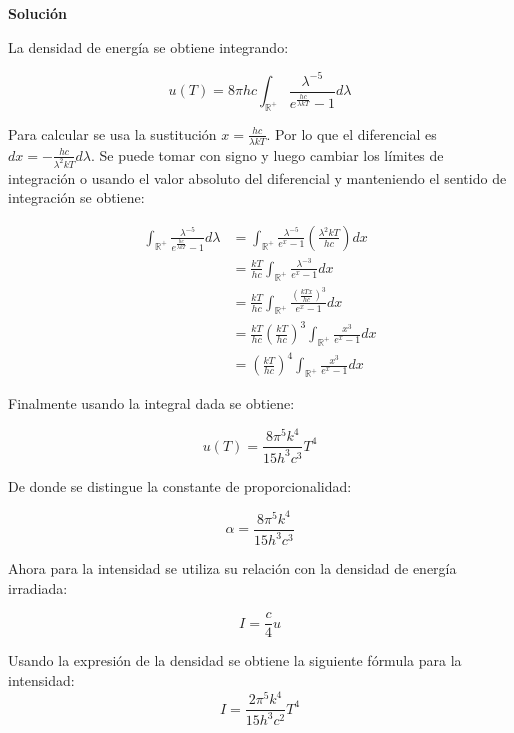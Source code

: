 \documentclass[12pt]{article}
\begin{document}
\begin{center}
	\textbf{Solución}
\end{center}

La densidad de energía se obtiene integrando:

\begin{equation*}
u(T) = 8\pi h c \int_{\mathbb{R}^+} \frac{\lambda^{-5}}{e^{\frac{hc}{\lambda k T}}-1} d\lambda
\end{equation*}

Para calcular se usa la sustitución $x =\frac{hc}{\lambda k T}$. Por lo que el diferencial es $dx = -\frac{hc}{\lambda^2 k T} d\lambda$. Se puede tomar con signo y luego cambiar los límites de integración o usando el valor absoluto del diferencial y manteniendo el sentido de integración se obtiene:

\begin{align*}
\int_{\mathbb{R}^+} \frac{\lambda^{-5}}{e^{\frac{hc}{\lambda k T}}-1} d\lambda &=\int_{\mathbb{R}^+} \frac{\lambda^{-5}}{e^{x}-1}\left(\frac{\lambda^2 k T}{hc}\right) dx \\
&=\frac{k T}{hc}\int_{\mathbb{R}^+}\frac{\lambda^{-3}}{e^{x}-1}dx \\
&=\frac{k T}{hc}\int_{\mathbb{R}^+}\frac{\left(\frac{kTx}{hc}\right)^3}{e^{x}-1}dx \\
&=\frac{k T}{hc}\left(\frac{kT}{hc}\right)^3\int_{\mathbb{R}^+}\frac{x^3}{e^{x}-1}dx \\
&=\left(\frac{kT}{hc}\right)^4\int_{\mathbb{R}^+}\frac{x^3}{e^{x}-1}dx 
\end{align*} 

Finalmente usando la integral dada se obtiene:


\begin{equation*}
u(T) = \frac{8\pi^5 k^ 4}{15 h^ 3 c^3} T^ 4
\end{equation*}

De donde se distingue la constante de proporcionalidad:

\begin{equation*}
\alpha = \frac{8\pi^5 k^ 4}{15 h^ 3 c^3} 
\end{equation*}

Ahora para la intensidad se utiliza su relación con la densidad de energía irradiada:

\begin{equation*}
I = \frac{c}{4}u
\end{equation*}

Usando la expresión de la densidad se obtiene la siguiente fórmula para la intensidad:
\begin{equation*}
I = \frac{2\pi^5 k^ 4}{15 h^ 3 c^2} T^ 4
\end{equation*}
\end{document}
